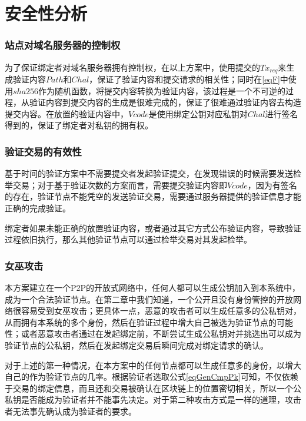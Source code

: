 \section{安全性分析}

\subsubsection{站点对域名服务器的控制权}

为了保证绑定者对域名服务器拥有控制权，在以上方案中，使用提交的$Tx_{req}$来生成验证内容$Path$和$Chal$，保证了验证内容和提交请求的相关性；同时在\eqref{eqF}中使用$sha256$作为随机函数，将提交内容转换为验证内容，该过程是一个不可逆的过程，从验证内容到提交内容的生成是很难完成的，保证了很难通过验证内容去构造提交内容。在放置的验证内容中，$Vcode$是使用绑定公钥对应私钥对$Chal$进行签名得到的，保证了绑定者对私钥的拥有权。


\subsubsection{验证交易的有效性}

基于时间的验证方案中不需要提交者发起验证提交，在发现错误的时候需要发送检举交易；对于基于验证次数的方案而言，需要提交验证内容即$Vcode$，因为有签名的存在，验证节点不能凭空的发送验证交易，需要通过服务器提供的验证信息才能正确的完成验证。

绑定者如果未能正确的放置验证内容，或者通过其它方式公布验证内容，导致验证过程依旧执行，那么其他验证节点可以通过检举交易对其发起检举。


\subsubsection{女巫攻击}

本方案建立在一个P2P的开放式网络中，任何人都可以生成公钥加入到本系统中，成为一个合法验证节点。在第二章中我们知道，一个公开且没有身份管控的开放网络很容易受到女巫攻击；更具体一点，恶意的攻击者可以生成任意多的公私钥对，从而拥有本系统的多个身份，然后在验证过程中增大自己被选为验证节点的可能性；或者恶意攻击者通过在发起绑定前，不断尝试生成公私钥对并挑选出可以成为验证节点的公私钥，然后在发起绑定交易后瞬间完成对绑定请求的确认。

对于上述的第一种情况，在本方案中的任何节点都可以生成任意多的身份，以增大自己的作为验证节点的几率。根据验证者选取公式\ref{eqGenCmpPk}可知，不仅依赖于交易的绑定信息，而且还和交易被确认在区块链上的位置密切相关，所以一个公私钥是否能成为验证者并不能事先决定。对于第二种攻击方式是一样的道理，攻击者无法事先确认成为验证者的要求。

